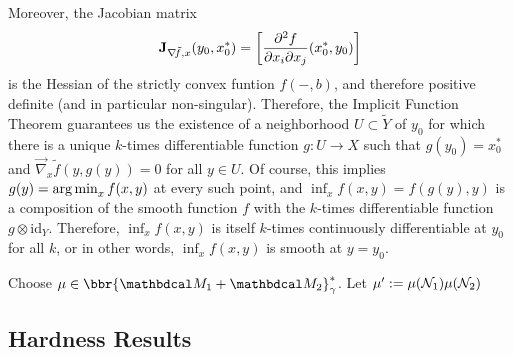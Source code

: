 \documentclass[twoside]{article}
\begin{document}
\begin{lproof}
	Moreover, the Jacobian matrix
	\[ \mathbf{J}_{\nabla\!\tilde f, x}(y_0, x_0^*) = \left[ \frac{\partial^2 f}{\partial x_i \partial x_j}(x^*_0, y_0) \right]\]
	is the Hessian of the strictly convex funtion $f(-, b)$, and therefore positive definite (and in particular non-singular).
	Therefore, the Implicit Function Theorem guarantees us the existence of a neighborhood $U \subset \tilde Y$ of $y_0$ for which
	there is a unique $k$-times differentiable function $g: U \to X$ such that $g(y_0) = x^*_0$ and $\vec\nabla_x \tilde f(y, g(y)) = 0$ for all $y \in U$. Of course, this implies $g(y) = \operatorname*{arg\,min}_x f(x,y)$ at every such point, and $\inf_x f(x,y) = f(g(y),y)$ is a composition of the smooth function $f$ with the $k$-times differentiable function $g \otimes \mathrm{id}_Y$.
	Therefore, $\inf_x f(x,y)$ is itself $k$-times continuously differentiable at $y_0$ for all $k$, or in other words, $\inf_x f(x,y)$ is smooth at $y=y_0$.
\end{lproof}

\begin{lproof}
	Choose $\mu \in \bbr{\dg M_1 \bundle \dg M_2}^*_\gamma$.
	Let $\mu' := \mu(\mathcal N_1) \mu(\mathcal N_2)$
	
\end{lproof}


\subsection{Hardness Results}
\end{document}
